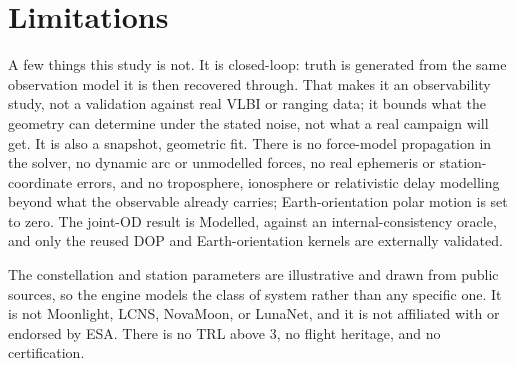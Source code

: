 \section{Limitations}

A few things this study is not. It is closed-loop: truth is generated from the
same observation model it is then recovered through. That makes it an
observability study, not a validation against real VLBI or ranging data; it
bounds what the geometry can determine under the stated noise, not what a real
campaign will get. It is also a snapshot, geometric fit. There is no force-model
propagation in the solver, no dynamic arc or unmodelled forces, no real ephemeris
or station-coordinate errors, and no troposphere, ionosphere or relativistic
delay modelling beyond what the observable already carries; Earth-orientation
polar motion is set to zero. The joint-OD result is Modelled, against an
internal-consistency oracle, and only the reused DOP and Earth-orientation
kernels are externally validated.

The constellation and station parameters are illustrative and drawn from public
sources, so the engine models the class of system rather than any specific one.
It is not Moonlight, LCNS, NovaMoon, or LunaNet, and it is not affiliated with or
endorsed by ESA. There is no TRL above 3, no flight heritage, and no
certification.
